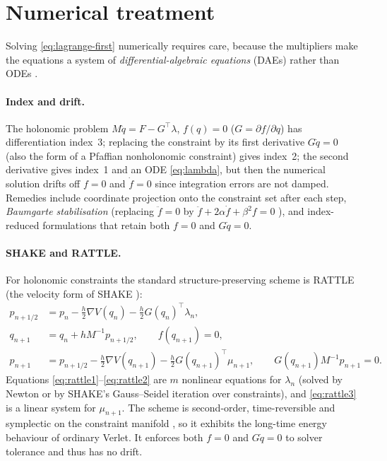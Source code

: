 \documentclass[11pt,a4paper]{article}
\theoremstyle{definition}
\theoremstyle{plain}
\theoremstyle{remark}
\newcommand{\transp}{^{\!\top}}
\begin{document}
\section{Numerical treatment}\label{sec:numerics}
Solving \eqref{eq:lagrange-first} numerically requires care, because the multipliers make
the equations a system of \emph{differential-algebraic equations} (DAEs) rather than ODEs
\cite{BrenanCP1996,HairerLW2006}.

\paragraph{Index and drift.}
The holonomic problem $M\ddot q=F-G\transp\lambda$, $f(q)=0$ ($G=\partial f/\partial q$)
has differentiation index~3; replacing the constraint by its first derivative $G\dot q=0$
(also the form of a Pfaffian nonholonomic constraint) gives index~2; the second derivative
gives index~1 and an ODE \eqref{eq:lambda}, but then the numerical solution drifts off
$f=0$ and $\dot f=0$ since integration errors are not damped. Remedies include coordinate projection
onto the constraint set after each step, \emph{Baumgarte stabilisation} (replacing
$\ddot f=0$ by $\ddot f+2\alpha\dot f+\beta^2f=0$ \cite{Baumgarte1972}), and
index-reduced formulations that retain both $f=0$ and $G\dot q=0$.

\paragraph{SHAKE and RATTLE.}
For holonomic constraints the standard structure-preserving scheme is RATTLE
\cite{Andersen1983} (the velocity form of SHAKE \cite{RyckaertEtAl1977}):
\begin{align}
  p_{n+1/2}&=p_n-\tfrac h2\nabla V(q_n)-\tfrac h2G(q_n)\transp\lambda_n,\label{eq:rattle1}\\
  q_{n+1}&=q_n+hM^{-1}p_{n+1/2},\qquad f(q_{n+1})=0,\label{eq:rattle2}\\
  p_{n+1}&=p_{n+1/2}-\tfrac h2\nabla V(q_{n+1})-\tfrac h2G(q_{n+1})\transp\mu_{n+1},\qquad G(q_{n+1})M^{-1}p_{n+1}=0.\label{eq:rattle3}
\end{align}
Equations \eqref{eq:rattle1}--\eqref{eq:rattle2} are $m$ nonlinear equations for $\lambda_n$ (solved
by Newton or by SHAKE's Gauss--Seidel iteration over constraints), and \eqref{eq:rattle3}
is a linear system for $\mu_{n+1}$. The scheme is second-order, time-reversible and symplectic
on the constraint manifold \cite{LeimkuhlerSkeel1994,LeimkuhlerReich2004}, so it exhibits the
long-time energy behaviour of ordinary Verlet. It enforces both $f=0$ and $G\dot q=0$ to
solver tolerance and thus has no drift.
\end{document}
